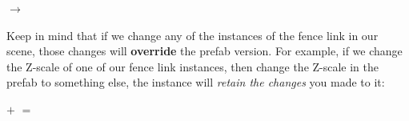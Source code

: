\documentclass[11pt]{article}
\begin{document}
\begin{center}
 $\rightarrow$
\end{center}
\pagebreak
Keep in mind that if we change any of the instances of the fence link in our scene, those changes
will \textbf{override} the prefab version.  For example, if we change the Z-scale of one of our
fence link instances, then change the Z-scale in the prefab to something else, the instance 
will \textit{retain the changes} you made to it:

\begin{center}
 $+$
 $=$ 
\end{center}
\end{document}
